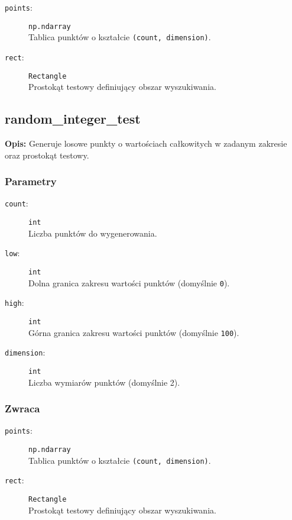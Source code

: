 \documentclass[12pt]{article}
\begin{document}
\begin{description}
    \item[\texttt{points}:] \texttt{np.ndarray} \\
    Tablica punktów o kształcie \texttt{(count, dimension)}.
    
    \item[\texttt{rect}:] \texttt{Rectangle} \\
    Prostokąt testowy definiujący obszar wyszukiwania.
\end{description}

\subsection{random\_integer\_test}

\textbf{Opis:} Generuje losowe punkty o wartościach całkowitych w zadanym zakresie oraz prostokąt testowy.

\subsubsection{Parametry}

\begin{description}
    \item[\texttt{count}:] \texttt{int} \\
    Liczba punktów do wygenerowania.
    
    \item[\texttt{low}:] \texttt{int} \\
    Dolna granica zakresu wartości punktów (domyślnie \texttt{0}).
    
    \item[\texttt{high}:] \texttt{int} \\
    Górna granica zakresu wartości punktów (domyślnie \texttt{100}).
    
    \item[\texttt{dimension}:] \texttt{int} \\
    Liczba wymiarów punktów (domyślnie 2).
\end{description}

\subsubsection{Zwraca}

\begin{description}
    \item[\texttt{points}:] \texttt{np.ndarray} \\
    Tablica punktów o kształcie \texttt{(count, dimension)}.
    
    \item[\texttt{rect}:] \texttt{Rectangle} \\
    Prostokąt testowy definiujący obszar wyszukiwania.
\end{description}
\end{document}
